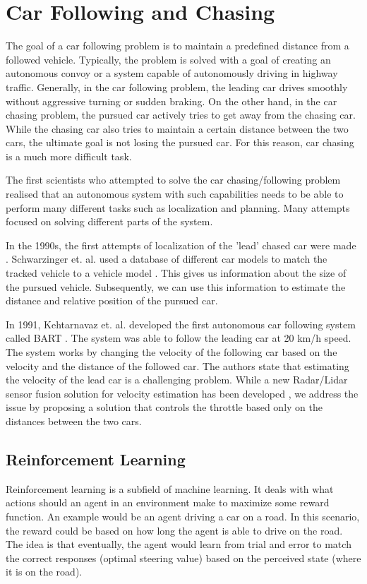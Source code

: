 \documentclass{ctuthesis/ctuthesis}
\begin{document}
\section{Car Following and Chasing}
The goal of a car following problem is to maintain a predefined distance from a followed vehicle. Typically, the problem is solved with a goal of creating an autonomous convoy or a system capable of autonomously driving in highway traffic. Generally, in the car following problem, the leading car drives smoothly without aggressive turning or sudden braking. On the other hand, in the car chasing problem, the pursued car actively tries to get away from the chasing car. While the chasing car also tries to maintain a certain distance between the two cars, the ultimate goal is not losing the pursued car. For this reason, car chasing is a much more difficult task. \par



The first scientists who attempted to solve the car chasing/following problem realised that an autonomous system with such capabilities needs to be able to perform many different tasks such as localization and planning. Many attempts focused on solving different parts of the system.\par

In the 1990s, the first attempts of localization of the 'lead' chased car were made \cite{only_detection_and_tracking} \cite{also_only_car_tracking} \cite{night}. Schwarzinger et. al. used a database of different car models to match the tracked vehicle to a vehicle model \cite{only_detection_and_tracking}. This gives us information about the size of the pursued vehicle. Subsequently, we can use this information to estimate the distance and relative position of the pursued car.


In 1991, Kehtarnavaz et. al. developed the first autonomous car following system called BART \cite{BART_car_following}. The system was able to follow the leading car at 20 km/h speed. The system works by changing the velocity of the following car based on the velocity and the distance of the followed car. The authors state that estimating the velocity of the lead car is a challenging problem. While a new Radar/Lidar sensor fusion solution for velocity estimation has been developed \cite{lidar_highway}, we address the issue by proposing a solution that controls the throttle based only on the distances between the two cars.


\subsection{Reinforcement Learning}
Reinforcement learning is a subfield of machine learning. It deals with what actions should an agent in an environment make to maximize some reward function. An example would be an agent driving a car on a road. In this scenario, the reward could be based on how long the agent is able to drive on the road. The idea is that eventually, the agent would learn from trial and error to match the correct responses (optimal steering value) based on the perceived state (where it is on the road).\par
\end{document}
